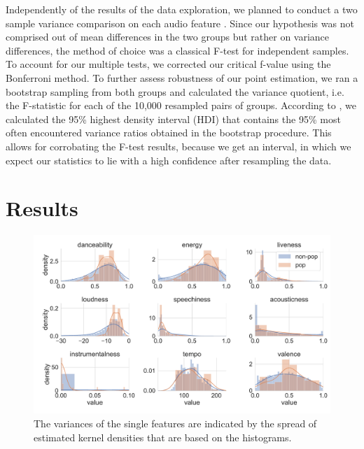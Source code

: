 \documentclass{article}
\begin{document}
Independently of the results of the data exploration, we planned to conduct a two sample variance comparison on each audio feature \citep{snedecor1989}. Since our hypothesis was not comprised out of mean differences in the two groups but rather on variance differences, the method of choice was a classical F-test for independent samples. To account for our multiple tests, we corrected our critical f-value using the Bonferroni method. To further assess robustness of our point estimation, we ran a bootstrap sampling from both groups and calculated the variance quotient, i.e. the F-statistic for each of the 10,000 resampled pairs of groups. According to \cite{kruschke2014},
we calculated the 95\% highest density interval (HDI) that contains the 95\%  most often encountered variance ratios obtained in the bootstrap procedure. This allows for corrobating the F-test results, because we get an interval, in which we expect our statistics to lie with a high confidence after resampling the data.

\section{Results}

\begin{figure}
  \centering
  \includegraphics[width=1\linewidth]{../fig/002_variances.pdf}
  \vspace*{-8mm}
  \caption{The variances of the single features are indicated by the spread of estimated kernel densities that are based on the histograms.}
  \label{fig:var}
\end{figure}
\end{document}
